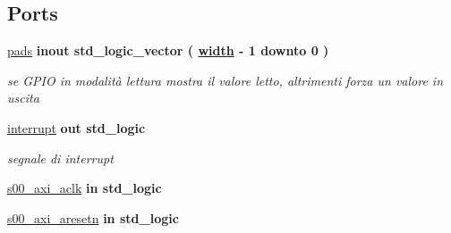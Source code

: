 \subsection*{Ports}
 \begin{DoxyCompactItemize}
\item 
\mbox{\label{classGPIO__v1__0_ac0744a550c27f11ab186fd7a1156a54e}} 
\hyperlink{classGPIO__v1__0_ac0744a550c27f11ab186fd7a1156a54e}{pads}  {\bfseries {\bfseries \textcolor{vhdlchar}{inout}\textcolor{vhdlchar}{ }}} {\bfseries \textcolor{vhdlchar}{std\+\_\+logic\+\_\+vector}\textcolor{vhdlchar}{ }\textcolor{vhdlchar}{(}\textcolor{vhdlchar}{ }\textcolor{vhdlchar}{ }\textcolor{vhdlchar}{ }\textcolor{vhdlchar}{ }{\bfseries \hyperlink{classGPIO__v1__0_a16bbf9205afa677edb8a74dcd39ebb9f}{width}} \textcolor{vhdlchar}{-\/}\textcolor{vhdlchar}{ } \textcolor{vhdldigit}{1} \textcolor{vhdlchar}{ }\textcolor{vhdlchar}{downto}\textcolor{vhdlchar}{ }\textcolor{vhdlchar}{ } \textcolor{vhdldigit}{0} \textcolor{vhdlchar}{ }\textcolor{vhdlchar}{)}\textcolor{vhdlchar}{ }} 
\begin{DoxyCompactList}\small\item\em se G\+P\+IO in modalità lettura mostra il valore letto, altrimenti forza un valore in uscita \end{DoxyCompactList}\item 
\mbox{\label{classGPIO__v1__0_a5b78f3e3edfaf6e8ec79031b9e631e9d}} 
\hyperlink{classGPIO__v1__0_a5b78f3e3edfaf6e8ec79031b9e631e9d}{interrupt}  {\bfseries {\bfseries \textcolor{vhdlchar}{out}\textcolor{vhdlchar}{ }}} {\bfseries \textcolor{vhdlchar}{std\+\_\+logic}\textcolor{vhdlchar}{ }} 
\begin{DoxyCompactList}\small\item\em segnale di interrupt \end{DoxyCompactList}\item 
\mbox{\label{classGPIO__v1__0_a037f9e3df8559bfd59db37bcba9cb7a8}} 
\hyperlink{classGPIO__v1__0_a037f9e3df8559bfd59db37bcba9cb7a8}{s00\+\_\+axi\+\_\+aclk}  {\bfseries {\bfseries \textcolor{vhdlchar}{in}\textcolor{vhdlchar}{ }}} {\bfseries \textcolor{vhdlchar}{std\+\_\+logic}\textcolor{vhdlchar}{ }} 
\item 
\mbox{\label{classGPIO__v1__0_a8249c106fbd80196dcad2666c9f0b3fc}} 
\hyperlink{classGPIO__v1__0_a8249c106fbd80196dcad2666c9f0b3fc}{s00\+\_\+axi\+\_\+aresetn}  {\bfseries {\bfseries \textcolor{vhdlchar}{in}\textcolor{vhdlchar}{ }}} {\bfseries \textcolor{vhdlchar}{std\+\_\+logic}\textcolor{vhdlchar}{ }} 

\end{DoxyCompactItemize}
